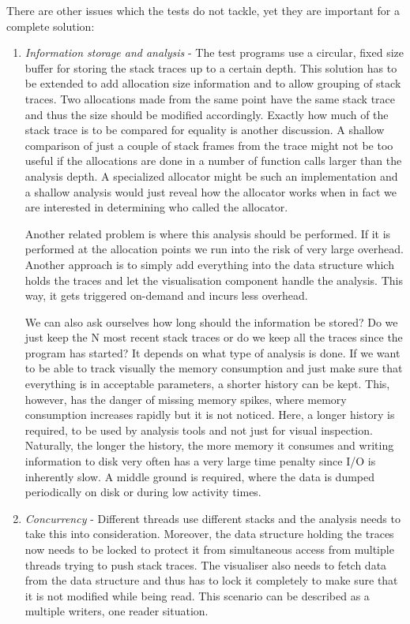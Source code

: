 There are other issues which the tests do not tackle, yet they are important for a complete solution:
\begin{enumerate}
\item \textit{Information storage and analysis} - The test programs use a circular, fixed size buffer for storing the stack traces up to a certain depth. This solution has to be extended to add allocation size information and to allow grouping of stack traces. Two allocations made from the same point have the same stack trace and thus the size should be modified accordingly. Exactly how much of the stack trace is to be compared for equality is another discussion. A shallow comparison of just a couple of stack frames from the trace might not be too useful if the allocations are done in a number of function calls larger than the analysis depth. A specialized allocator might be such an implementation and a shallow analysis would just reveal how the allocator works when in fact we are interested in determining who called the allocator.

Another related problem is where this analysis should be performed. If it is performed at the allocation points we run into the risk of very large overhead. Another approach is to simply add everything into the data structure which holds the traces and let the visualisation component handle the analysis. This way, it gets triggered on-demand and incurs less overhead.

We can also ask ourselves how long should the information be stored? Do we just keep the N most recent stack traces or do we keep all the traces since the program has started? It depends on what type of analysis is done. If we want to be able to track visually the memory consumption and just make sure that everything is in acceptable parameters, a shorter history can be kept. This, however, has the danger of missing memory spikes, where memory consumption increases rapidly but it is not noticed. Here, a longer history is required, to be used by analysis tools and not just for visual inspection. Naturally, the longer the history, the more memory it consumes and writing information to disk very often has a very large time penalty since I/O is inherently slow. A middle ground is required, where the data is dumped periodically on disk or during low activity times.

\item \textit{Concurrency} - Different threads use different stacks and the analysis needs to take this into consideration. Moreover, the data structure holding the traces now needs to be locked to protect it from simultaneous access from multiple threads trying to push stack traces. The visualiser also needs to fetch data from the data structure and thus has to lock it completely to make sure that it is not modified while being read. This scenario can be described as a multiple writers, one reader situation.

\end{enumerate}

